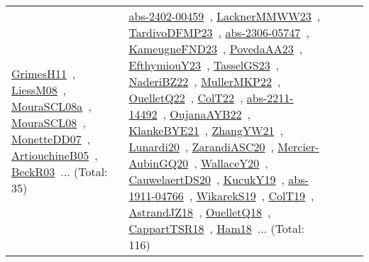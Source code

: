 {\begin{longtable}{lp{3cm}>{\raggedright\arraybackslash}p{6cm}>{\raggedright\arraybackslash}p{6cm}>{\raggedright\arraybackslash}p{8cm}}
\href{works/GrimesH11.pdf}{GrimesH11}~\cite{GrimesH11}, \href{works/LiessM08.pdf}{LiessM08}~\cite{LiessM08}, \href{works/MouraSCL08a.pdf}{MouraSCL08a}~\cite{MouraSCL08a}, \href{works/MouraSCL08.pdf}{MouraSCL08}~\cite{MouraSCL08}, \href{works/MonetteDD07.pdf}{MonetteDD07}~\cite{MonetteDD07}, \href{works/ArtiouchineB05.pdf}{ArtiouchineB05}~\cite{ArtiouchineB05}, \href{works/BeckR03.pdf}{BeckR03}~\cite{BeckR03}... (Total: 35) & \href{works/abs-2402-00459.pdf}{abs-2402-00459}~\cite{abs-2402-00459}, \href{works/LacknerMMWW23.pdf}{LacknerMMWW23}~\cite{LacknerMMWW23}, \href{works/TardivoDFMP23.pdf}{TardivoDFMP23}~\cite{TardivoDFMP23}, \href{works/abs-2306-05747.pdf}{abs-2306-05747}~\cite{abs-2306-05747}, \href{works/KameugneFND23.pdf}{KameugneFND23}~\cite{KameugneFND23}, \href{works/PovedaAA23.pdf}{PovedaAA23}~\cite{PovedaAA23}, \href{works/EfthymiouY23.pdf}{EfthymiouY23}~\cite{EfthymiouY23}, \href{works/TasselGS23.pdf}{TasselGS23}~\cite{TasselGS23}, \href{works/NaderiBZ22.pdf}{NaderiBZ22}~\cite{NaderiBZ22}, \href{works/MullerMKP22.pdf}{MullerMKP22}~\cite{MullerMKP22}, \href{works/OuelletQ22.pdf}{OuelletQ22}~\cite{OuelletQ22}, \href{works/ColT22.pdf}{ColT22}~\cite{ColT22}, \href{works/abs-2211-14492.pdf}{abs-2211-14492}~\cite{abs-2211-14492}, \href{works/OujanaAYB22.pdf}{OujanaAYB22}~\cite{OujanaAYB22}, \href{works/KlankeBYE21.pdf}{KlankeBYE21}~\cite{KlankeBYE21}, \href{works/ZhangYW21.pdf}{ZhangYW21}~\cite{ZhangYW21}, \href{works/Lunardi20.pdf}{Lunardi20}~\cite{Lunardi20}, \href{works/ZarandiASC20.pdf}{ZarandiASC20}~\cite{ZarandiASC20}, \href{works/Mercier-AubinGQ20.pdf}{Mercier-AubinGQ20}~\cite{Mercier-AubinGQ20}, \href{works/WallaceY20.pdf}{WallaceY20}~\cite{WallaceY20}, \href{works/CauwelaertDS20.pdf}{CauwelaertDS20}~\cite{CauwelaertDS20}, \href{works/KucukY19.pdf}{KucukY19}~\cite{KucukY19}, \href{works/abs-1911-04766.pdf}{abs-1911-04766}~\cite{abs-1911-04766}, \href{works/WikarekS19.pdf}{WikarekS19}~\cite{WikarekS19}, \href{works/ColT19.pdf}{ColT19}~\cite{ColT19}, \href{works/AstrandJZ18.pdf}{AstrandJZ18}~\cite{AstrandJZ18}, \href{works/OuelletQ18.pdf}{OuelletQ18}~\cite{OuelletQ18}, \href{works/CappartTSR18.pdf}{CappartTSR18}~\cite{CappartTSR18}, \href{works/Ham18.pdf}{Ham18}~\cite{Ham18}... (Total: 116)\\

\end{longtable}}
